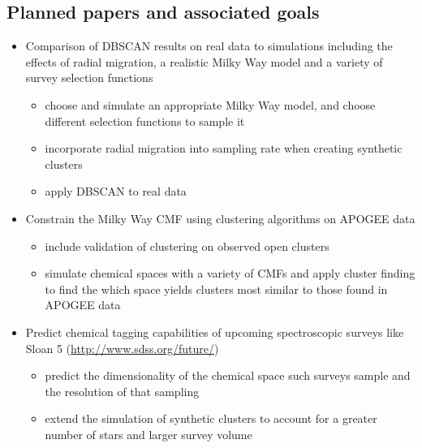 \documentclass[11pt]{article}
\begin{document}
\subsection*{Planned papers and associated goals}
\begin{itemize}
	\item Comparison of DBSCAN results on real data to simulations including the effects of radial migration, a realistic Milky Way model and a variety of survey selection functions
	\begin{itemize}
	\item choose and simulate an appropriate Milky Way model, and choose different selection functions to sample it
	\item incorporate radial migration into sampling rate when creating synthetic clusters
	\item apply DBSCAN to real data
	\end{itemize}
	\item Constrain the Milky Way CMF using clustering algorithms on APOGEE data
	\begin{itemize}
	\item include validation of clustering on observed open clusters
	\item simulate chemical spaces with a variety of CMFs and apply cluster finding to find the which space yields clusters most similar to those found in APOGEE data
	\end{itemize}
	\item Predict chemical tagging capabilities of upcoming spectroscopic surveys like Sloan 5 (\url{http://www.sdss.org/future/})
	\begin{itemize}
	\item predict the dimensionality of the chemical space such surveys sample and the resolution of that sampling
	\item extend the simulation of synthetic clusters to account for a greater number of stars and larger survey volume
	\end{itemize}
\end{itemize}


\end{document}
